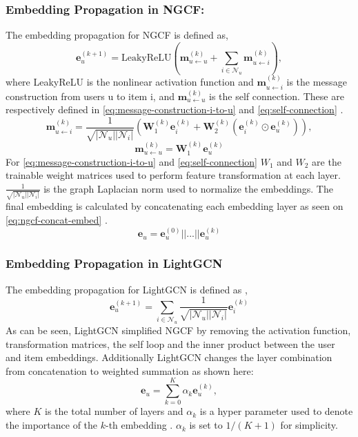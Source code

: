 \subsubsection{Embedding Propagation in NGCF:}
The embedding propagation for NGCF is defined as,
\begin{equation}
    \mathbf{e}_{u}^{(k+1)} = \mbox{LeakyReLU}(\mathbf{m}^{(k)}_{u \leftarrow u} + \sum^{}_{i \in \mathcal{N}_u} \mathbf{m}^{(k)}_{u \leftarrow i}),
    \label{eq:ngcf-embedding-propagation}
\end{equation}
where LeakyReLU is the nonlinear activation function and $\mathbf{m}^{(k)}_{u \leftarrow i}$ is the message construction from users u to item i, and $\mathbf{m}^{(k)}_{u \leftarrow u}$ is the self connection.
These are respectively defined in \autoref{eq:message-construction-i-to-u} and \autoref{eq:self-connection} \cite{NGCF_2019}.
\begin{equation}
    \mathbf{m}^{(k)}_{u \leftarrow i} = \frac{1}{\sqrt{|\mathcal{N}_u||\mathcal{N}_i|}}(\mathbf{W}^{(k)}_1\mathbf{e}^{(k)}_i + \mathbf{W}^{(k)}_2(\mathbf{e}^{(k)}_i \odot \mathbf{e}^{(k)}_u)),
    \label{eq:message-construction-i-to-u}
\end{equation}
\begin{equation}
    \mathbf{m}^{(k)}_{u \leftarrow u} = \mathbf{W}_1^{(k)}\mathbf{e}_u^{(k)}
    \label{eq:self-connection}
\end{equation}
For \autoref{eq:message-construction-i-to-u} and \autoref{eq:self-connection} $W_1$ and $W_2$ are the trainable weight matrices used to perform feature transformation at each layer.
$\frac{1}{\sqrt{|\mathcal{N}_u||\mathcal{N}_i|}}$ is the graph Laplacian norm used to normalize the embeddings.
The final embedding is calculated by concatenating each embedding layer as seen on \autoref{eq:ngcf-concat-embed} \cite{NGCF_2019}.
\begin{equation}
    \mathbf{e}_u = \mathbf{e}_u^{(0)}||...||\mathbf{e}_u^{(k)}
    \label{eq:ngcf-concat-embed}
\end{equation}

\subsubsection{Embedding Propagation in LightGCN}
The embedding propagation for LightGCN is defined as \cite{lightgcn},
\begin{equation}
    \mathbf{e}_{u}^{(k+1)} = \sum^{}_{i \in \mathcal{N}_u} \frac{1}{\sqrt{|\mathcal{N}_u||\mathcal{N}_i|}} \mathbf{e}_i^{(k)}
\end{equation}
As can be seen, LightGCN simplified NGCF by removing the activation function, transformation matrices, the self loop and the inner product between the user and item embeddings.
Additionally LightGCN changes the layer combination from concatenation to weighted summation as shown here:
\begin{equation}
    \mathbf{e}_u = \sum_{k=0}^{K} \alpha_k \mathbf{e}_u^{(k)},
    \label{eq:lightgcn-sum}
\end{equation}
where $K$ is the total number of layers and $\alpha_k$ is a hyper parameter used to denote the importance of the $k$-th embedding \cite{lightgcn}.
$\alpha_k$ is set to $1 /(K + 1)$ for simplicity.

